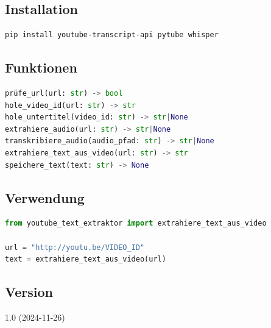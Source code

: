 \documentclass{content/vorlage-design-main}
\begin{document}
\subsection{Installation}\label{installation-4}

\begin{lstlisting}[language=bash]
pip install youtube-transcript-api pytube whisper
\end{lstlisting}

\subsection{Funktionen}\label{funktionen-1}

\begin{lstlisting}[language=Python]
prüfe_url(url: str) -> bool
hole_video_id(url: str) -> str
hole_untertitel(video_id: str) -> str|None
extrahiere_audio(url: str) -> str|None
transkribiere_audio(audio_pfad: str) -> str|None
extrahiere_text_aus_video(url: str) -> str
speichere_text(text: str) -> None
\end{lstlisting}

\subsection{Verwendung}\label{verwendung-6}

\begin{lstlisting}[language=Python]
from youtube_text_extraktor import extrahiere_text_aus_video

url = "http://youtu.be/VIDEO_ID"
text = extrahiere_text_aus_video(url)
\end{lstlisting}

\subsection{Version}\label{version-5}

1.0 (2024-11-26)


\clearpage
\printbibliography
\end{document}

